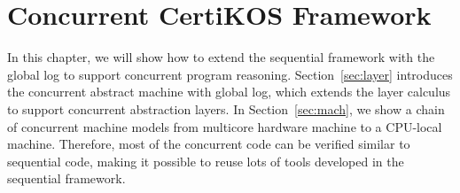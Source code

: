 \chapter{Concurrent CertiKOS Framework}
\label{chap:con}

In this chapter, we will show how to
extend the sequential \CTOS{} framework
with the global log
to support concurrent program reasoning.
Section~\ref{sec:layer} introduces
the concurrent abstract machine with
global log, which extends the layer calculus
to support concurrent abstraction layers.
In Section~\ref{sec:mach},
we show a chain of concurrent
machine models from
multicore hardware machine
to a CPU-local machine.
Therefore,  most of the concurrent code
can be verified similar to sequential code,
making it possible to reuse lots of tools
developed in the sequential \CTOS{} framework.


